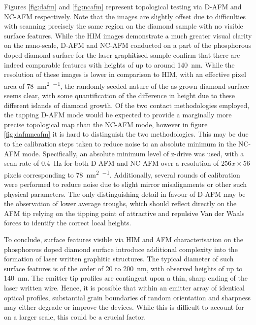 \begin{refsection}
Figures \ref{fig:dafm} and \ref{fig:ncafm} represent topological testing via D-AFM and NC-AFM respectively. Note that the images are slightly offset due to difficulties with scanning precisely the same region on the diamond sample with no visible surface features. While the HIM images demonstrate a much greater visual clarity on the nano-scale, D-AFM and NC-AFM conducted on a part of the phosphorous doped diamond surface for the laser graphitised sample confirm that there are indeed comparable features with heights of up to around 140~\si{\nano\metre}. While the resolution of these images is lower in comparison to HIM, with an effective pixel area of 78~\si{\nano\metre\squared\per\pixel}, the randomly seeded nature of the as-grown diamond surface seems clear, with some quantification of the difference in height due to these different islands of diamond growth. Of the two contact methodologies employed, the tapping D-AFM mode would be expected to provide a marginally more precise topological map than the NC-AFM mode, however in figure \ref{fig:dafmncafm} it is hard to distinguish the two methodologies. This may be due to the calibration steps taken to reduce noise to an absolute minimum in the NC-AFM mode. Specifically, an absolute minimum level of z-drive was used, with a scan rate of 0.4~\si{\hertz} for both D-AFM and NC-AFM over a resolution of $256x\times56$ pixels corresponding to 78~\si{\nano\metre\squared\per\pixel}. Additionally, several rounds of calibration were performed to reduce noise due to slight mirror misalignments or other such physical parameters. The only distinguishing detail in favour of D-AFM may be the observation of lower average troughs, which should reflect directly on the AFM tip relying on the tipping point of attractive and repulsive Van der Waals forces to identify the correct local heights.

To conclude, surface features visible via HIM and AFM characterisation on the phosphorous doped diamond surface introduce additional complexity into the formation of laser written graphitic structures. The typical diameter of such surface features is of the order of 20 to 200~\si{\nano\metre}, with observed heights of up to 140~\si{\nano\metre}. The emitter tip profiles are contingent upon a thin, sharp ending of the laser written wire. Hence, it is possible that within an emitter array of identical optical profiles, substantial grain boundaries of random orientation and sharpness may either degrade or improve the devices. While this is difficult to account for on a larger scale, this could be a crucial factor.


\end{refsection}
